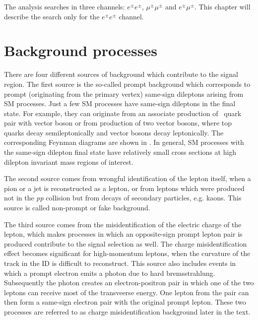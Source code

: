 The analysis searches in three channels: $e^{\pm}e^{\pm}$, $\mu^{\pm}\mu^{\pm}$ and $e^{\pm}\mu^{\pm}$.
This chapter will describe the search only for the $e^{\pm}e^{\pm}$ channel.

\section{Background processes}
\label{sec:wprimeBackgrounds}

There are four different sources of background which contribute to the signal region.
The first source is the so-called prompt background which corresponds to prompt (originating from the primary vertex) same-sign dileptons arising from SM processes.
Just a few SM processes have same-sign dileptons in the final state. 
For example, they can originate from an associate production of \ttbar~quark pair with vector boson or from production of two vector bosons,
where top quarks decay semileptonically and vector bosons decay leptonically.
The corresponding Feynman diagrams are shown in .
In general, SM processes with the same-sign dilepton final state have relatively small cross sections at high dilepton invariant mass regions of interest.

The second source comes from wrongful identification of the lepton itself, when a pion or a jet is reconstructed as a lepton, or from leptons which were produced 
not in the \textit{pp} collision but from decays of secondary particles, e.g. kaons. This source is called non-prompt or fake background.

The third source comes from the misidentification of the electric charge of the lepton, which makes processes in which an opposite-sign prompt lepton pair is produced 
contribute to the signal selection as well. The charge misidentification effect becomes significant for high-momentum leptons, when the curvature of the track in the ID is difficult to reconstruct. 
This source also includes events in which a prompt electron emits a photon due to hard bremsstrahlung. Subsequently the photon creates an electron-positron pair in which one of the two leptons can receive most of the transveerse energy.
One lepton from the pair can then form a same-sign electron pair with the original prompt lepton. These two processes are referred to as charge misidentification 
background later in the text.

